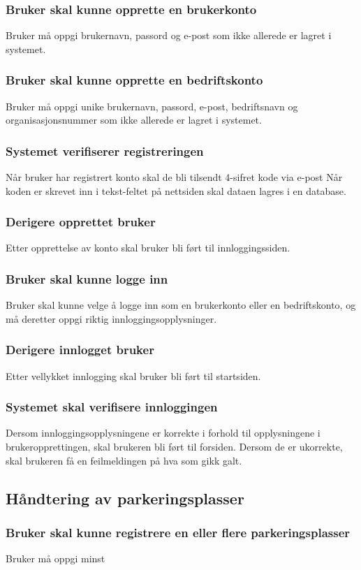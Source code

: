 \documentclass[12pt]{article}
\begin{document}
\subsubsection{Bruker skal kunne opprette en brukerkonto}
Bruker må oppgi brukernavn, passord og e-post som ikke allerede er lagret i systemet.

\subsubsection{Bruker skal kunne opprette en bedriftskonto}
Bruker må oppgi unike brukernavn, passord, e-post, bedriftsnavn og organisasjonsnummer som ikke allerede er lagret i systemet.

\subsubsection{Systemet verifiserer registreringen}
Når bruker har registrert konto skal de bli tilsendt 4-sifret kode via e-post Når koden er skrevet inn i tekst-feltet på nettsiden skal dataen lagres i en database.

\subsubsection{Derigere opprettet bruker}
Etter opprettelse av konto skal bruker bli ført til innloggingssiden.

\subsubsection{Bruker skal kunne logge inn}
Bruker skal kunne velge å logge inn som en brukerkonto eller en bedriftskonto, og må deretter oppgi riktig innloggingsopplysninger.

\subsubsection{Derigere innlogget bruker}
Etter vellykket innlogging skal bruker bli ført til startsiden.

\subsubsection{Systemet skal verifisere innloggingen}
Dersom innloggingsopplysningene er korrekte i forhold til opplysningene i brukeropprettingen, skal brukeren bli ført til forsiden. Dersom de er ukorrekte, skal brukeren få en feilmeldingen på hva som gikk galt.

\subsection{Håndtering av parkeringsplasser}

\subsubsection{Bruker skal kunne registrere en eller flere parkeringsplasser}
Bruker må oppgi minst 
\end{document}
